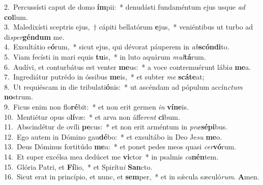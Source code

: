 {2.~}Percussísti caput de domo \textbf{ím}pii:~* denudásti fundaméntum ejus usque \textit{ad} \textbf{col}lum.\\
{3.~}Maledixísti sceptris ejus,~† cápiti bellatórum \textbf{e}jus,~* veniéntibus ut turbo ad di\textit{sper}\textbf{gén}\textbf{dum} me.\\
{4.~}Exsultátio e\textbf{ó}rum,~* sicut ejus, qui dévorat páuperem in \textit{ab}\textbf{scón}\textbf{di}to.\\
{5.~}Viam fecísti in mari equis \textbf{tu}is,~* in luto aquárum \textit{mul}\textbf{tá}rum.\\
{6.~}Audívi, et conturbátus est venter \textbf{me}us:~* a voce contremuérunt lábi\textit{a} \textbf{me}a.\\
{7.~}Ingrediátur putrédo in óssibus \textbf{me}is,~* et subter \textit{me} \textbf{scá}\textbf{te}at;\\
{8.~}Ut requiéscam in die tribulati\textbf{ó}nis:~* ut ascéndam ad pópulum accín\textit{ctum} \textbf{no}strum.\\
{9.~}Ficus enim non flo\textbf{ré}bit:~* et non erit germen \textit{in} \textbf{ví}\textbf{ne}is.\\
{10.~}Mentiétur opus o\textbf{lí}væ:~* et arva non áffe\textit{rent} \textbf{ci}bum.\\
{11.~}Abscindétur de ovíli \textbf{pe}cus:~* et non erit arméntum in \textit{præ}\textbf{sé}\textbf{pi}bus.\\
{12.~}Ego autem in Dómino gau\textbf{dé}bo:~* et exsultábo in Deo Je\textit{su} \textbf{me}o.\\
{13.~}Deus Dóminus fortitúdo \textbf{me}a:~* et ponet pedes meos quasi \textit{cer}\textbf{vó}rum.\\
{14.~}Et super excélsa mea dedúcet me \textbf{vi}ctor~* in psalmis \textit{ca}\textbf{nén}tem.\\
{15.~}Glória Patri, et \textbf{Fí}lio,~* et Spirítu\textit{i} \textbf{San}cto.\\
{16.~}Sicut erat in princípio, et nunc, et \textbf{sem}per,~* et in sǽcula sæculó\textit{rum}. \textbf{A}men.\\
